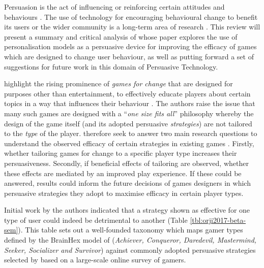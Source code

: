\documentclass[11pt]{article}
\begin{document}
Persuasion is the act of influencing or reinforcing certain attitudes and behaviours \citep{khaled2008}. The use of technology for encouraging behavioural change to benefit its users or the wider community is a long-term area of research \citep{fogg2002}. This review will present a summary and critical analysis of \citet{orji2017} whose paper explores the use of personalisation models as a persuasive device for improving the efficacy of games which are designed to change user behaviour, as well as putting forward a set of suggestions for future work in this domain of Persuasive Technology.

\citet{orji2017} highlight the rising prominence of \textit{games for change} that are designed for purposes other than entertainment, to effectively educate players about certain topics in a way that influences their behaviour \citep{busch2015}. The authors raise the issue that many such games are designed with a ``\textit{one size fits all}'' philosophy whereby the design of the game itself (and its adopted persuasive \textit{strategies}) are not tailored to the \textit{type} of the player. \citet{orji2017} therefore seek to answer two main research questions to understand the observed efficacy of certain strategies in existing games \citep{peng2009,kaipainen2012}. Firstly, whether tailoring games for change to a specific player type increases their persuasiveness. Secondly, if beneficial effects of tailoring are observed, whether these effects are mediated by an improved play experience. If these could be answered, results could inform the future decisions of games designers in which persuasive strategies they adopt to maximise efficacy in certain player types.

Initial work by the authors indicated that a strategy shown as effective for one type of user could indeed be detrimental to another \citep{orji2013} (Table \ref{tbl:orji2017-beta-sem}). This table sets out a well-founded taxonomy which maps gamer types defined by the BrainHex model of \citet{nacke2014} (\textit{Achiever, Conqueror, Daredevil, Mastermind, Seeker, Socializer and Survivor}) against commonly adopted persuasive strategies selected by \citet{gerling2014} based on a large-scale online survey of gamers. 
\end{document}
